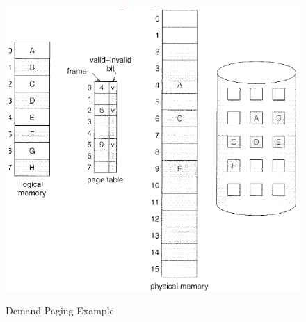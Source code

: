 \documentclass[10pt,a4paper]{article}
\begin{document}
\begin{figure}
\caption{Demand Paging Example \cite{OSCONCEPTS}}
\begin{center}
\includegraphics[scale=0.45]{../images/demand-paging-example.png}
\label{demandex}
\end{center}
\end{figure}
\end{document}
